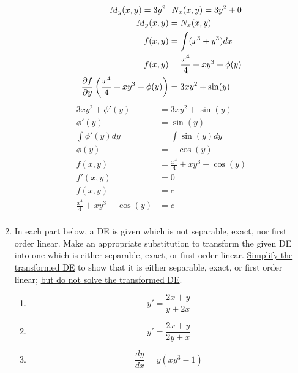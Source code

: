 \documentclass[12pt]{report}
\begin{document}
\begin{enumerate}[label=\arabic*.]
{\begin{equation*}
\begin{aligned}
		M_{y}(x,y) = 3y^{2} \mbox{ } & \mbox{ } N_{x}(x,y) = 3y^{2} + 0\\
		M_{y}(x,y) &= N_{x}(x,y)\\
		f(x, y) &= \int (x^{3} + y^{3}) dx\\
		f(x, y) &= \frac{x^{4}}{4} + xy^{3} + \phi(y)\\
		\frac{\partial f}{\partial y}\left( \frac{x^{4}}{4} + xy^{3} + \phi(y) \right) &= 3xy^{2} + \sin(y)\\
	\end{aligned}
	\end{equation*}\begin{equation*}
	\begin{aligned}
		3xy^{2} + \phi'(y) &= 3xy^{2} + \sin(y)\\
		\phi'(y) &= \sin(y)\\
		\int \phi'(y) dy &= \int \sin(y) dy\\
		\phi(y) &= -\cos(y)\\
		f(x, y) &= \frac{x^{4}}{4} + xy^{3} - \cos(y)\\
		f'(x, y) &= 0\\
		f(x, y) &= c\\
		\frac{x^{4}}{4} + xy^{3} - \cos(y) &= c\\
	\end{aligned}
	\end{equation*}}
	\item In each part below, a DE is given which is not separable, exact, nor first order linear. Make an appropriate substitution to transform the given DE into one which is either separable, exact, or first order linear. \underline{Simplify the transformed DE} to show that it is either separable, exact, or first order linear; \underline{but do not solve the transformed DE}.
	\begin{enumerate}[label=(\roman*)]
	    \item \[ y' = \frac{2x + y}{y + 2x} \]
	    \item \[ y' = \frac{2x + y}{2y + x} \]
		\item \[ \frac{dy}{dx} = y(xy^{3} - 1) \]\answer{\begin{equation*}

\end{equation*}}
\end{enumerate}
\end{enumerate}
\end{document}
